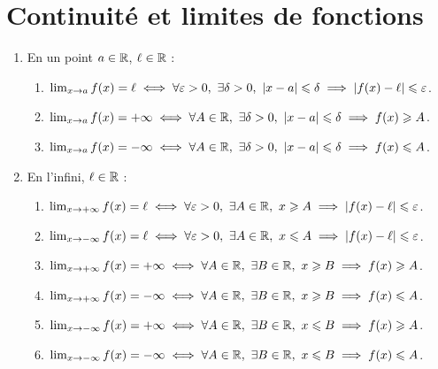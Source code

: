 \chapter{Continuité et limites de fonctions}
\def\arraystretch{1}

\begin{definition}
    \begin{enumerate}
        \item En un point $a \in \mathbb{R}$, $\ell \in \mathbb{R}$ :
        \begin{enumerate}
            \item $ \lim_{x \to a} f(x) = \ell \iff 
	\forall \varepsilon > 0,\ \exists \delta > 0,\ \abs{x - a} \leqslant \delta \implies \abs{f(x) - \ell} \leqslant \varepsilon $.
            \item $ \lim_{x \to a} f(x) = +\infty \iff 
	\forall A \in \mathbb{R},\ \exists \delta > 0,\ \abs{x - a} \leqslant \delta \implies f(x) \geqslant A $.
            \item $ \lim_{x \to a} f(x) = -\infty \iff 
	\forall A \in \mathbb{R},\ \exists \delta > 0,\ \abs{x - a} \leqslant \delta \implies f(x) \leqslant A $.
        \end{enumerate}
        \item En l'infini, $\ell \in \mathbb{R}$ : 
        \begin{enumerate}
            \item $ \lim_{x \to +\infty} f(x) = \ell \iff 
	\forall \varepsilon > 0,\ \exists A \in \mathbb{R},\ x \geqslant A \implies \abs{f(x) - \ell} \leqslant \varepsilon $.
            \item $ \lim_{x \to -\infty} f(x) = \ell \iff 
	\forall \varepsilon > 0,\ \exists A \in \mathbb{R},\ x \leqslant A \implies \abs{f(x) - \ell} \leqslant \varepsilon $.
            \item $\lim_{x \to +\infty} f(x) = +\infty \iff 
	\forall A \in \mathbb{R},\ \exists B \in \mathbb{R},\ x \geqslant B \implies f(x) \geqslant A $.
            \item $ \lim_{x \to +\infty} f(x) = -\infty \iff 
	\forall A \in \mathbb{R},\ \exists B \in \mathbb{R},\ x \geqslant B \implies f(x) \leqslant A $.
            \item $ \lim_{x \to -\infty} f(x) = +\infty \iff 
	\forall A \in \mathbb{R},\ \exists B \in \mathbb{R},\ x \leqslant B \implies f(x) \geqslant A $.
            \item $\lim_{x \to -\infty} f(x) = -\infty \iff 
	\forall A \in \mathbb{R},\ \exists B \in \mathbb{R},\ x \leqslant B \implies f(x) \leqslant A$.
        \end{enumerate}
    \end{enumerate}
\end{definition}

